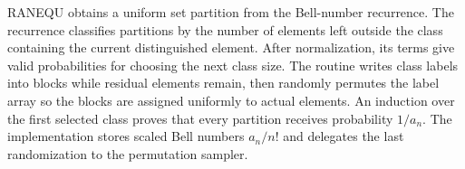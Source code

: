 \documentclass[10pt,letterpaper]{article}
\begin{document}
\begin{tcolorbox}[colback=Ink!4,colframe=Ink,title=Cornell summary]
RANEQU obtains a uniform set partition from the Bell-number recurrence. The recurrence classifies partitions by the number of elements left outside the class containing the current distinguished element. After normalization, its terms give valid probabilities for choosing the next class size. The routine writes class labels into blocks while residual elements remain, then randomly permutes the label array so the blocks are assigned uniformly to actual elements. An induction over the first selected class proves that every partition receives probability $1/a_n$. The implementation stores scaled Bell numbers $a_n/n!$ and delegates the last randomization to the permutation sampler.
\end{tcolorbox}
\end{document}
